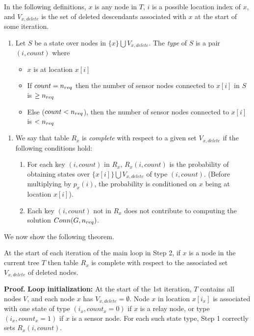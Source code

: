 In the following definitions, $x$ is any node in $T$,
$i$ is a possible location index of $x$, and  $V_{x,delete}$ is
the set of deleted descendants associated with $x$ at the start of some
iteration.

\begin{enumerate}[noitemsep]
\item[{\bf [D1]}]
    Let $S$ be a state over nodes in $\{ x \} \bigcup V_{x,delete}$.
    The {\em type} of $S$ is a pair $(i,count)$ where
    \begin{itemize}
    \item   $x$ is at location $x[i]$
    \item   If $count = {n_{req}}$ then the number of sensor nodes connected to
    	    $x[i]$ in $S$ is $\geq {n_{req}}$
    \item   Else ($count < {n_{req}}$), then the number of sensor nodes
    	    connected to $x[i]$ is $< {n_{req}}$
    \end{itemize} 	   
\end{enumerate}

\begin{enumerate}
\item[{\bf [D2]}]
    We say that table $R_x$ is {\em complete} with respect to a given
    set $V_{x,delete}$ if the following conditions hold:
    \begin{enumerate}
    \item  For each key $(i,count)$ in $R_x$, $R_x(i,count)$ is
    	   the probability of obtaining states over
	   $\{ x[i] \} \bigcup V_{x,delete}$ of type $(i,count)$.
	   (Before multiplying by $p_x(i)$, the probability is conditioned
	   on $x$ being at location $x[i]$).
    \item  Each key $(i,count)$ not in $R_x$ does not contribute to
    	   computing the solution $Conn(G,{n_{req}})$.
    \end{enumerate}
\end{enumerate}

\nwline
We now show the following theorem.

\begin{theorem} \label{thm:correctness}
\normalfont
    At the start of each iteration of the main loop in Step 2,
    if $x$ is a node in the current tree $T$ then table $R_x$ is complete
    with respect to the associated set $V_{x,delete}$ of deleted nodes.
\end{theorem}

\nwline
{\bf Proof.}
\nwline
{\bf Loop initialization:}
At the start of the 1st iteration, $T$ contains all nodes $V$, and
each node $x$ has $V_{x,delete}= \emptyset$.
%
Node $x$ in location $x[i_x]$ is associated with one state of type
$(i_x,count_x= 0)$ if $x$ is a relay node, or type
$(i_x,count_x= 1)$ if $x$ is a sensor node.
%
For each such state type, Step 1 correctly sets $R_x(i,count)$.

